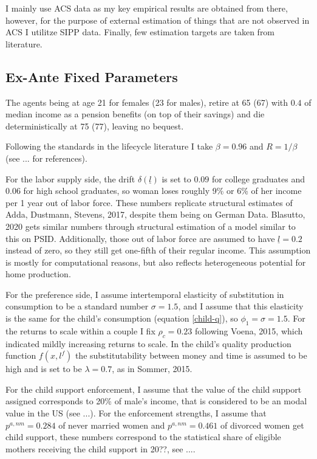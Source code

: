 \documentclass[12pt,letter]{article}
\begin{document}
I mainly use ACS data as my key empirical results are obtained from there, however, for the purpose of external estimation of things that are not observed in ACS I utilitze SIPP data. Finally, few estimation targets are taken from literature. 

\subsection{Ex-Ante Fixed Parameters}
The agents being at age 21 for females (23 for males), retire at 65 (67) with $0.4$ of median income as a pension benefits (on top of their savings) and die deterministically at 75 (77), leaving no bequest.

Following the standards in the lifecycle literature I take $\beta = 0.96$ and $R = 1/\beta$ (see ... for references).

For the labor supply side, the drift $\delta(\underline{l})$ is set to $0.09$ for college graduates and $0.06$ for high school graduates, so woman loses roughly 9\% or 6\% of her income per 1 year out of labor force. These numbers replicate structural estimates of Adda, Dustmann, Stevens, 2017\nocite{adda2017}, despite them being on German Data. Blasutto, 2020 gets similar numbers through structural estimation of a model similar to this on PSID. Additionally, those out of labor force are assumed to have $\underline{l} = 0.2$ instead of zero, so they still get one-fifth of their regular income. This assumption is mostly for computational reasons, but also reflects heterogeneous potential for home production.

For the preference side, I assume intertemporal elasticity of substitution in consumption to be a standard number $\sigma = 1.5$, and I assume that this elasticity is the same for the child's consumption (equation \ref{child-q}), so $\phi_1 = \sigma = 1.5$. For the returns to scale within a couple I fix $\rho_c = 0.23$ following Voena, 2015, which indicated mildly increasing returns to scale. In the child's quality production function $f(x,l^f)$ the substitutability between money and time is assumed to be high and is set to be $\lambda = 0.7$, as in Sommer, 2015.

For the child support enforcement, I assume that the value of the child support assigned corresponds to 20\% of male's income, that is considered to be an modal value in the US (see ...). For the enforcement strengths, I assume that $p^{a,{nm}} = 0.284$ of never married women and $p^{a,{nm}} = 0.461$ of divorced women get child support, these numbers correspond to the statistical share of eligible mothers receiving the child support in 20??, see ....
\end{document}
